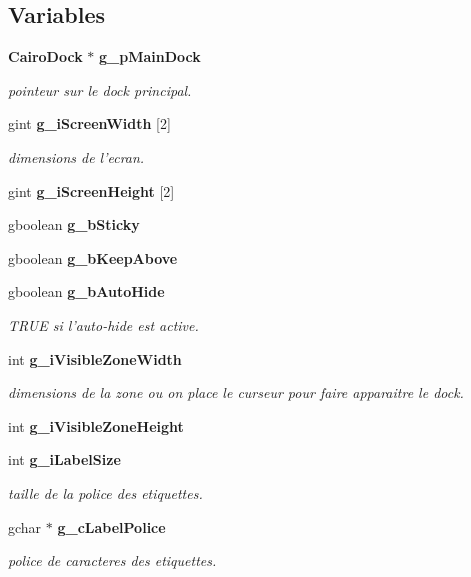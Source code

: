 \subsection*{Variables}
\begin{CompactItemize}
\item 
{\bf Cairo\-Dock} $\ast$ {\bf g\_\-p\-Main\-Dock}
\begin{CompactList}\small\item\em pointeur sur le dock principal. \item\end{CompactList}\item 
gint {\bf g\_\-i\-Screen\-Width} [2]
\begin{CompactList}\small\item\em dimensions de l'ecran. \item\end{CompactList}\item 
gint {\bf g\_\-i\-Screen\-Height} [2]
\item 
gboolean {\bf g\_\-b\-Sticky}
\item 
gboolean {\bf g\_\-b\-Keep\-Above}
\item 
gboolean {\bf g\_\-b\-Auto\-Hide}
\begin{CompactList}\small\item\em TRUE si l'auto-hide est active. \item\end{CompactList}\item 
int {\bf g\_\-i\-Visible\-Zone\-Width}
\begin{CompactList}\small\item\em dimensions de la zone ou on place le curseur pour faire apparaitre le dock. \item\end{CompactList}\item 
int {\bf g\_\-i\-Visible\-Zone\-Height}
\item 
int {\bf g\_\-i\-Label\-Size}
\begin{CompactList}\small\item\em taille de la police des etiquettes. \item\end{CompactList}\item 
gchar $\ast$ {\bf g\_\-c\-Label\-Police}
\begin{CompactList}\small\item\em police de caracteres des etiquettes. \item\end{CompactList}\item 

\end{CompactItemize}
